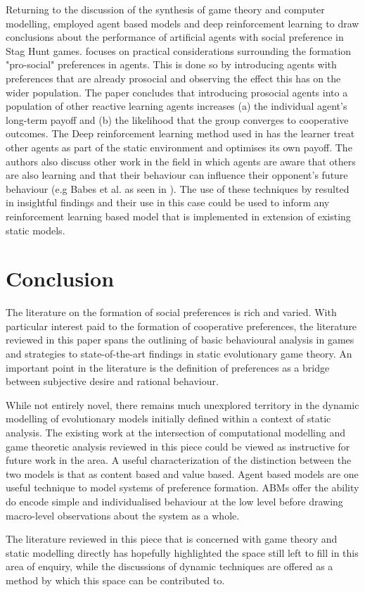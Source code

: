 \documentclass[11pt]{article}
\newcommand*{\np}{\par\noindent\newline}
\begin{document}
\np Returning to the discussion of the synthesis of game theory and computer modelling,
\citet{peysakhovich_prosocial_2017} employed agent based models and deep reinforcement learning to draw conclusions about the performance of artificial agents with social preference in Stag Hunt games.
\citet{peysakhovich_prosocial_2017} focuses on practical considerations surrounding the formation "pro-social" preferences in agents. This is done so by introducing agents with preferences that are already prosocial and observing the effect this has on the wider population. The paper concludes that introducing prosocial agents into a population of other reactive learning agents increases (a) the individual agent's long-term payoff and (b) the likelihood that the group converges to cooperative outcomes. The Deep reinforcement learning method used in \citet{peysakhovich_prosocial_2017} has the learner treat other agents as part of the static environment and optimises its own payoff. The authors also discuss other work in the field in which agents are aware that others are also learning and that their behaviour can influence their opponent's future behaviour (e.g Babes et al. as seen in \citealt{peysakhovich_prosocial_2017}). The use of these techniques by \citet{peysakhovich_prosocial_2017} resulted in insightful findings and their use in this case could be used to inform any reinforcement learning based model that is implemented in extension of existing static models.

\section{Conclusion}\label{conc}
The literature on the formation of social preferences is rich and varied. With particular interest paid to the formation
of cooperative preferences, the literature reviewed in this paper spans the outlining of basic behavioural analysis in
games and strategies to state-of-the-art findings in static evolutionary game theory. An important point in the
literature is the definition of preferences as a bridge between subjective desire and rational behaviour. 

\np While not entirely novel, there remains much unexplored territory in the dynamic modelling of evolutionary models
initially defined within a context of static analysis. The existing work at the intersection of computational modelling
and game theoretic analysis reviewed in this piece could be viewed as instructive for future work in the area. A useful
characterization of the distinction between the two models is that as content based and value based. Agent based models
are one useful technique to model systems of preference formation. ABMs offer the ability do encode simple and
individualised behaviour at the low level before drawing macro-level observations about the system as a whole.

\np The literature reviewed in this piece that is concerned with game theory and static modelling directly has hopefully
highlighted the space still left to fill in this area of enquiry, while the discussions of dynamic techniques are offered as a method by which this space can be contributed to.
 
\newpage


\end{document}
